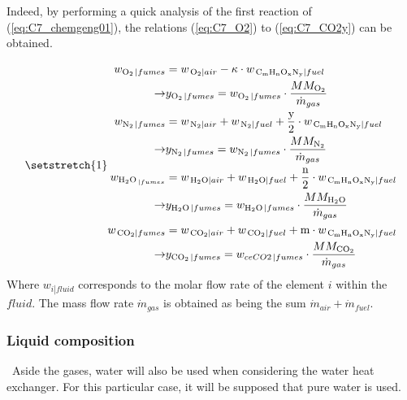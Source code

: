 Indeed, by performing a quick analysis of the first reaction of (\ref{eq:C7_chemgeng01}), the relations (\ref{eq:C7_O2}) to (\ref{eq:C7_CO2y}) can be obtained.

\begin{subequations}
\setstretch{1}
\begin{align}
    w_{\ce{O2}\left.\right|{fumes}} &= w_{\left.\ce{O2}\right|{air}} - \kappa\cdot w_{\left.\ce{C_{\text{m}}H_{\text{n}}O_{\text{x}}N_{\text{y}}}\right|{fuel}}\label{eq:C7_O2}\\
    \rightarrow & y_{\ce{O2}\left.\right|{fumes}} =  w_{\ce{O2}\left.\right|{fumes}}\cdot \frac{MM_{\ce{O2}}}{\dot{m}_{gas}}\label{eq:C7_O2y}\\
    w_{\ce{N2}\left.\right|{fumes}} &= w_{\left.\ce{N2}\right|{air}} + w_{\left.\ce{N2}\right|{fuel}} + \frac{\text{y}}{2}\cdot w_{\left.\ce{C_{\text{m}}H_{\text{n}}O_{\text{x}}N_{\text{y}}}\right|{fuel}}\label{eq:C7_N2}\\
    \rightarrow & y_{\ce{N2}\left.\right|{fumes}} =  w_{\ce{N2}\left.\right|{fumes}}\cdot \frac{MM_{\ce{N2}}}{\dot{m}_{gas}}\label{eq:C7_N2y}\\
    w_{\ce{H2O}_{\left.\right|{fumes}}} &= w_{\left.\ce{H2O}\right|{air}} + w_{\left.\ce{H2O}\right|{fuel}} + \frac{\text{n}}{2}\cdot w_{\left.\ce{C_{\text{m}}H_{\text{n}}O_{\text{x}}N_{\text{y}}}\right|{fuel}}\label{eq:C7_H2O}\\
    \rightarrow & y_{\ce{H2O}\left.\right|{fumes}} =  w_{\ce{H2O}\left.\right|{fumes}}\cdot \frac{MM_{\ce{H2O}}}{\dot{m}_{gas}}\label{eq:C7_H2Oy}\\
    w_{\left.\ce{CO2}\right|{fumes}} &= w_{\left.\ce{CO2}\right|{air}} + w_{\left.\ce{CO2}\right|{fuel}} + \text{m}\cdot w_{\left.\ce{C_{\text{m}}H_{\text{n}}O_{\text{x}}N_{\text{y}}}\right|{fuel}}\label{eq:C7_CO2}\\
    \rightarrow & y_{\ce{CO2}\left.\right|{fumes}} =  w_{ce{CO2}\left.\right|{fumes}}\cdot \frac{MM_{\ce{CO2}}}{\dot{m}_{gas}}\label{eq:C7_CO2y}
\end{align}\label{eq:C7_compfumes}
\end{subequations}
Where $w_{\left.i\right|fluid}$ corresponds to the molar flow rate of the element $i$ within the $fluid$. The mass flow rate $\dot{m}_{gas}$ is obtained as being the sum $\dot{m}_{air}+\dot{m}_{fuel}$.

\subsubsection{Liquid composition}
\quad\ Aside the gases, water will also be used when considering the water heat exchanger. For this particular case, it will be supposed that pure water is used.

